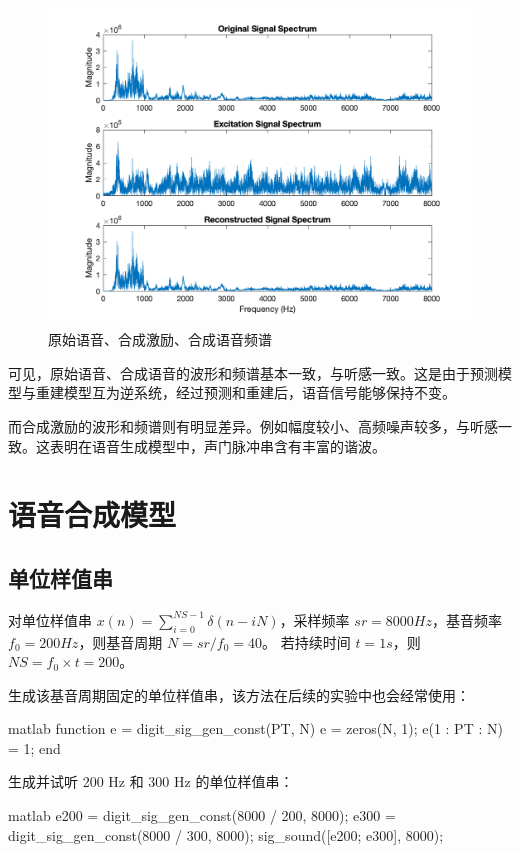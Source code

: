 \documentclass[a4paper]{article}  %
\begin{document}
\begin{figure}[ht]
    \centering
    \includegraphics[width=.6\textwidth]{asserts/1_6_signal_f.png}
    \caption{
        原始语音、合成激励、合成语音频谱
    }\label{fig:1_6_signal_f}
\end{figure}

可见，原始语音、合成语音的波形和频谱基本一致，与听感一致。这是由于预测模型与重建模型互为逆系统，经过预测和重建后，语音信号能够保持不变。

而合成激励的波形和频谱则有明显差异。例如幅度较小、高频噪声较多，与听感一致。这表明在语音生成模型中，声门脉冲串含有丰富的谐波。


\section{语音合成模型}

\subsection{单位样值串}

对单位样值串 $x(n) = \sum_{i=0}^{NS-1}\delta(n-iN)$，采样频率 $sr = 8000 Hz$，基音频率 $f_0 = 200 Hz$，则基音周期 $N = sr / f_0 = 40$。
若持续时间 $t = 1s$，则 $NS = f_0 \times t = 200$。

生成该基音周期固定的单位样值串，该方法在后续的实验中也会经常使用：
\begin{codeblock}{matlab}
function e = digit_sig_gen_const(PT, N)
    e = zeros(N, 1);
    e(1 : PT : N) = 1;
end
\end{codeblock}

生成并试听 200 Hz 和 300 Hz 的单位样值串：
\begin{codeblock}{matlab}
e200 = digit_sig_gen_const(8000 / 200, 8000);
e300 = digit_sig_gen_const(8000 / 300, 8000);
sig_sound([e200; e300], 8000);
\end{codeblock}
\end{document}
